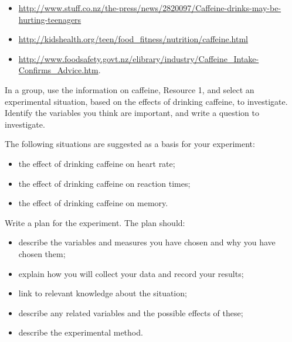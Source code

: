\begin{itemize}
  \item \url{http://www.stuff.co.nz/the-press/news/2820097/Caffeine-drinks-may-be-hurting-teenagers}
  \item \url{http://kidshealth.org/teen/food_fitness/nutrition/caffeine.html}
  \item \url{http://www.foodsafety.govt.nz/elibrary/industry/Caffeine_Intake-Confirms_Advice.htm}.
\end{itemize}
In a group, use the information on caffeine, Resource 1, and select an experimental situation, based on the effects of drinking
caffeine, to investigate. Identify the variables you think are important, and write a question to investigate.

The following situations are suggested as a basis for your experiment:
\begin{itemize}
  \item the effect of drinking caffeine on heart rate;
  \item the effect of drinking caffeine on reaction times;
  \item the effect of drinking caffeine on memory.
\end{itemize}

Write a plan for the experiment. The plan should:
\begin{itemize}
  \item describe the variables and measures you have chosen and why you have chosen them;
  \item explain how you will collect your data and record your results;
  \item link to relevant knowledge about the situation;
  \item describe any related variables and the possible effects of these;
  \item describe the experimental method.
\end{itemize}



